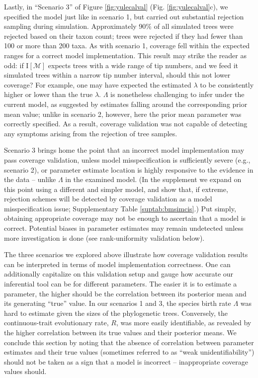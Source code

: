 \documentclass[oneside]{article}
\begin{document}
Lastly, in ``Scenario 3'' of Figure \ref{fig:yulecalval} (Fig. \ref{fig:yulecalval}c), we specified the model just like in scenario 1, but carried out substantial rejection sampling during simulation.
Approximately 90\% of all simulated trees were rejected based on their taxon count; trees were rejected if they had fewer than 100 or more than 200 taxa.
As with scenario 1, coverage fell within the expected ranges for a correct model implementation.
This result may strike the reader as odd: if $\text{I}[\mathcal{M}]$ expects trees with a wide range of tip numbers, and we feed it simulated trees within a narrow tip number interval, should this not lower coverage?
For example, one may have expected the estimated $\lambda$ to be consistently higher or lower than the true $\lambda$.
$\Lambda$ is nonetheless challenging to infer under the current model, as suggested by estimates falling around the corresponding prior mean value; unlike in scenario 2, however, here the prior mean parameter was correctly specified.
As a result, coverage validation was not capable of detecting any symptoms arising from the rejection of tree samples.

Scenario 3 brings home the point that an incorrect model implementation may pass coverage validation, unless model misspecification is sufficiently severe (e.g., scenario 2), or parameter estimate location is highly responsive to the evidence in the data -- unlike $\Lambda$ in the examined model.
(In the supplement we expand on this point using a different and simpler model, and show that, if extreme, rejection schemes will be detected by coverage validation as a model misspecification issue; Supplementary Table \ref{suptab:bmsimcis}.)
Put simply, obtaining appropriate coverage may not be enough to ascertain that a model is correct.
Potential biases in parameter estimates may remain undetected unless more investigation is done (see rank-uniformity validation below).

The three scenarios we explored above illustrate how coverage validation results can be interpreted in terms of model implementation correctness.
One can additionally capitalize on this validation setup and gauge how accurate our inferential tool can be for different parameters. 
The easier it is to estimate a parameter, the higher should be the correlation between its posterior mean and its generating ``true'' value.
In our scenarios 1 and 3, the species birth rate $\Lambda$ was hard to estimate given the sizes of the phylogenetic trees.
Conversely, the continuous-trait evolutionary rate, $R$, was more easily identifiable, as revealed by the higher correlation between its true values and their posterior means.
We conclude this section by noting that the absence of correlation between parameter estimates and their true values (sometimes referred to as ``weak unidentifiability'') should not be taken as a sign that a model is incorrect -- inappropriate coverage values should.
\end{document}
